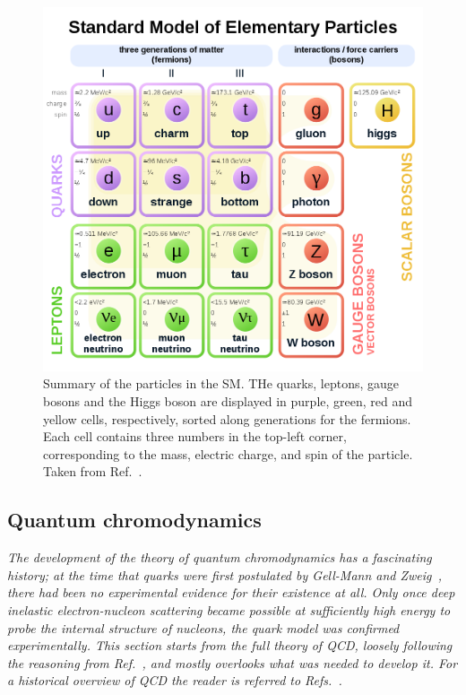 \begin{figure}[hbtp]
  \begin{center}
    \includegraphics[width=0.7\linewidth]{img/theory/particles.png}
    \caption{
        Summary of the particles in the SM.
        THe quarks, leptons, gauge bosons and the Higgs boson are displayed in purple, green, red and yellow cells, respectively, sorted along generations for the fermions.
        Each cell contains three numbers in the top-left corner, corresponding to the mass, electric charge, and spin of the particle.
        Taken from Ref.~\cite{particles-wikicommons}.
        }
    \label{fig:particles}
  \end{center}
\end{figure}




\subsection{Quantum chromodynamics}

\textit{%
The development of the theory of quantum chromodynamics has a fascinating history; at the time that quarks were first postulated by Gell-Mann and Zweig~\cite{todo}, there had been no experimental evidence for their existence at all.
% 
Only once deep inelastic electron-nucleon scattering became possible at sufficiently high energy to probe the internal structure of nucleons, the quark model was confirmed experimentally.
% 
This section starts from the full theory of QCD, loosely following the reasoning from Ref.~\cite{dissertori}, and mostly overlooks what was needed to develop it.
% 
For a historical overview of QCD the reader is referred to Refs.~\cite{dissertori,griffiths}. 
}


